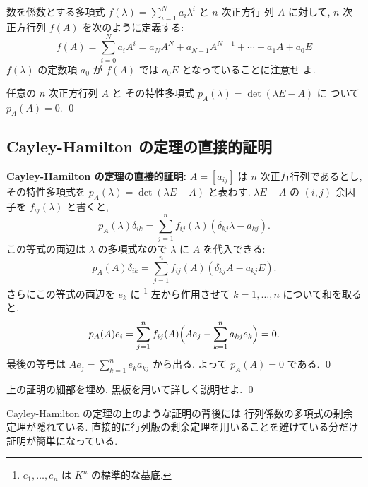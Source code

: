 \documentclass[12pt,twoside]{jarticle}
\begin{document}
数を係数とする多項式 $f(\lambda)=\sum_{i=1}^N a_i\lambda^i$ と $n$ 次正方行
列 $A$ に対して, $n$ 次正方行列 $f(A)$ を次のように定義する:
\begin{equation*}
  f(A) = \sum_{i=0}^N a_i A^i 
  = a_N A^N + a_{N-1}A^{N-1} + \cdots + a_1 A + a_0 E
\end{equation*}
$f(\lambda)$ の定数項 $a_0$ が $f(A)$ では $a_0 E$ となっていることに注意せ
よ.

\begin{theorem}
  任意の $n$ 次正方行列 $A$ と
  その特性多項式 $p_A(\lambda)=\det(\lambda E - A)$ に
  ついて $p_A(A)=0$.  \qed
\end{theorem}


\subsection{Cayley-Hamilton の定理の直接的証明}
\label{sec:CH-direct}

{\bf Cayley-Hamilton の定理の直接的証明:} 
$A=[a_{ij}]$ は $n$ 次正方行列であるとし, 
その特性多項式を $p_A(\lambda)=\det(\lambda E - A)$ と表わす.
$\lambda E - A$ の $(i,j)$ 余因子を $f_{ij}(\lambda)$ と書くと,
\begin{equation*}
  p_A(\lambda)\delta_{ik}
  = \sum_{j=1}^n f_{ij}(\lambda) (\delta_{kj}\lambda - a_{kj}).
\end{equation*}
この等式の両辺は $\lambda$ の多項式なので $\lambda$ に $A$ を代入できる:
\begin{equation*}
  p_A(A)\delta_{ik} = \sum_{j=1}^n f_{ij}(A)(\delta_{kj}A - a_{kj}E).
\end{equation*}
さらにこの等式の両辺を $e_k$ に%
\footnote{$e_1,\dots,e_n$ は $K^n$ の標準的な基底.}%
左から作用させて $k=1,\dots,n$ について和を取ると, 
\begin{equation*}
  p_A(A)e_i
  = \sum_{j=1}^n f_{ij}(A)\Bigl( A e_j - \sum_{k=1}^n a_{kj} e_k \Bigr)
  = 0.
\end{equation*}
最後の等号は $Ae_j=\sum_{k=1}^n e_k a_{kj}$ から出る. 
よって $p_A(A)=0$ である.
\qed

\begin{question}[15点]
  上の証明の細部を埋め, 黒板を用いて詳しく説明せよ. \qed
\end{question}

Cayley-Hamilton の定理の上のような証明の背後には
行列係数の多項式の剰余定理が隠れている.  
直接的に行列版の剰余定理を用いることを避けている分だけ
証明が簡単になっている.
\end{document}
